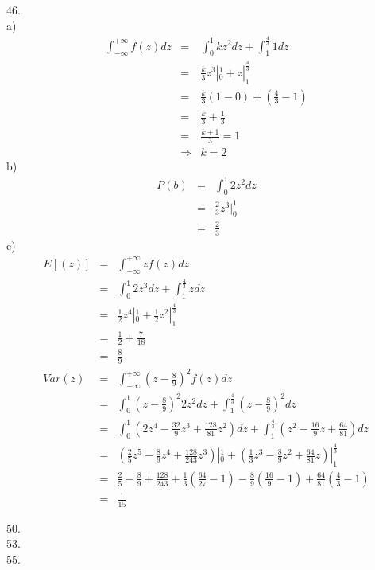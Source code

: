 \documentclass[12pt]{article}
\begin{document}
46. \\
a)
\begin{eqnarray*}
  \int_{-\infty}^{+\infty} f(z) dz
  &=& \int_{0}^{1} kz^2 dz + \int_{1}^{\frac {4}{3}} 1 dz \\
  &=& \frac {k}{3} z^3|_0^1 + z|_1^{\frac {4}{3}} \\
  &=& \frac {k}{3} (1 - 0) + (\frac {4}{3} - 1) \\
  &=& \frac {k}{3} + \frac{1}{3} \\
  &=& \frac {k+1}{3} = 1 \\
  &\Longrightarrow& k = 2
\end{eqnarray*}
b)
\begin{eqnarray*}
  P(b)
  &=&\int_{0}^{1} 2 z^2 dz \\
  &=& \frac {2}{3} z^3|_0^1 \\
  &=& \frac {2}{3}
\end{eqnarray*}
c)
\begin{eqnarray*}
  E[(z)]
  &=& \int_{-\infty}^{+\infty} zf(z) dz \\
  &=& \int_{0}^{1} 2z^3 dz + \int_{1}^{\frac {4}{3}} z dz \\
  &=& \frac {1}{2} z^4|_0^1 + \frac {1}{2} z^2|_1^{\frac {4}{3}} \\
  &=& \frac {1}{2} + \frac {7}{18} \\
  &=& \frac {8}{9} \\
  Var(z)
  &=& \int_{-\infty}^{+\infty} (z - \frac {8}{9})^2 f(z) dz \\
  &=& \int_{0}^{1} (z - \frac {8}{9})^2 2z^2 dz
  + \int_{1}^{\frac {4}{3}} (z - \frac {8}{9})^2 dz \\
  &=& \int_{0}^{1} (2 z^4 - \frac {32}{9} z^3 + \frac {128}{81} z^2) dz
  + \int_{1}^{\frac {4}{3}} (z^2 - \frac {16}{9} z + \frac {64}{81}) dz \\
  &=& (\frac {2}{5} z^5 - \frac {8}{9} z^4 + \frac {128}{243} z^3)|_0^1
  + (\frac{1}{3} z^3 - \frac{8}{9} z^2 + \frac{64}{81} z)|_1^{\frac {4}{3}} \\
  &=& \frac {2}{5} - \frac {8}{9} + \frac {128}{243}
  + \frac {1}{3} (\frac{64}{27} - 1) - \frac{8}{9}(\frac{16}{9} - 1)
  + \frac{64}{81} (\frac {4}{3} - 1) \\
  &=& \frac {1}{15}
\end{eqnarray*}

50. \\



53. \\

55. \\
\end{document}
